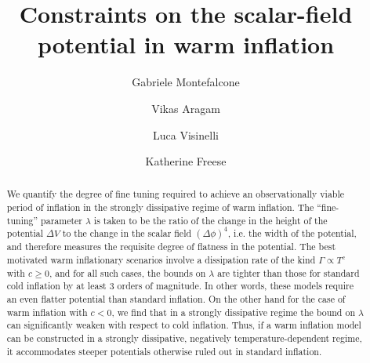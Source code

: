 \documentclass[aps,prd,twocolumn,amssymb,amsmath,floatfix,nofootinbib,superscriptaddress,preprintnumbers]{revtex4-1}
\begin{document}
\title[Constraints on the scalar-field potential in warm inflation]{Constraints on the scalar-field potential in warm inflation}
\author{Gabriele Montefalcone}


\author{Vikas Aragam}

\author{Luca Visinelli}

\author{Katherine Freese}

\begin{abstract}
We quantify the degree of fine tuning required to achieve an observationally viable period of inflation in the strongly dissipative regime of warm inflation. The ``fine-tuning'' parameter $\lambda$ is taken to be the ratio of the change in the height of the potential $\Delta V$ to the change in the scalar field $(\Delta \phi)^{4}$, i.e. the width of the potential, and therefore measures the requisite degree of flatness in the potential. The best motivated warm inflationary scenarios involve a dissipation rate of the kind $\Gamma\propto T^c$ with $c\geq 0$, and for all such cases, the bounds on $\lambda$ are tighter than those for standard cold inflation by at least 3 orders of magnitude. In other words, these models require an even flatter potential than standard inflation. On the other hand for the case of warm inflation with $c< 0$, we find that in a strongly dissipative regime the bound on $\lambda$ can significantly weaken with respect to cold inflation. Thus, if a warm inflation model can be constructed in a strongly dissipative, negatively temperature-dependent regime, it accommodates steeper potentials otherwise ruled out in standard inflation.
\end{abstract}
\maketitle
\end{document}
